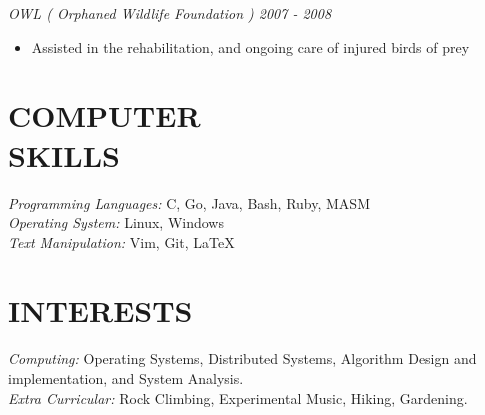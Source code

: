 \documentclass[line,margin]{res}
\begin{document}
\begin{resume}
{\sl OWL ( Orphaned Wildlife Foundation ) {\hfill 2007 - 2008}
    \begin{itemize}
         \item Assisted in the rehabilitation, and ongoing care of injured birds of prey
    \end{itemize}
}
    

\section{COMPUTER \\ SKILLS} 
	{\sl Programming Languages:} C, Go, Java, Bash, Ruby, MASM\\
	{\sl Operating System:} Linux, Windows\\
	{\sl Text Manipulation:} Vim, Git, \LaTeX \\

\section{INTERESTS}
	{\sl Computing:} Operating Systems, Distributed Systems, Algorithm Design and implementation, and System Analysis.\\
	{\sl Extra Curricular:} Rock Climbing, Experimental Music, Hiking, Gardening.\\

\end{resume}
\end{document}
